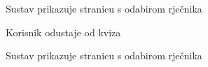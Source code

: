 \begin{packed_item}
\begin{packed_item}
\begin{packed_enum}
								\item Sustav prikazuje stranicu s odabirom rječnika
								
							\end{packed_enum}
							
							\item[4.a] Korisnik odustaje od kviza 
							\item[] \begin{packed_enum}
								
								\item Sustav prikazuje stranicu s odabirom rječnika
								
							\end{packed_enum}
							
						\end{packed_item}
					\end{packed_item}
					
